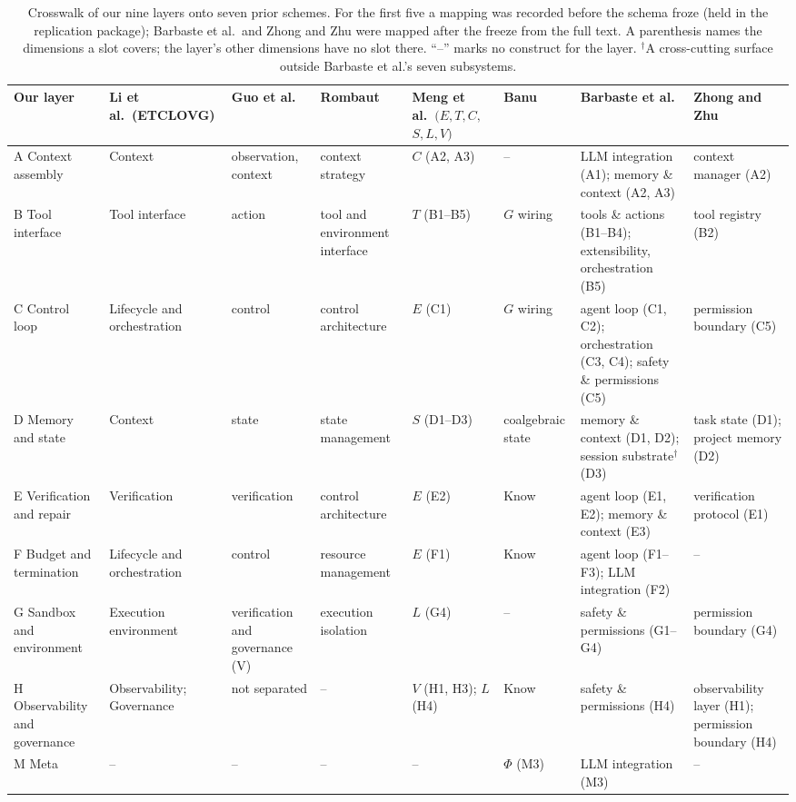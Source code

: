 \begin{table}[t]
\centering
\scriptsize
\setlength{\tabcolsep}{3pt}
\caption{Crosswalk of our nine layers onto seven prior schemes. For the first five a mapping was
recorded before the schema froze (held in the replication package); Barbaste et al.\ and Zhong and
Zhu were mapped after the freeze from the full text. A parenthesis names the dimensions a slot
covers; the layer's other dimensions have no slot there. ``--'' marks no construct for the layer.
$^\dagger$A cross-cutting surface outside Barbaste et al.'s seven subsystems.}
\label{tab:crosswalk}
\begin{tabular}{@{}p{1.7cm}p{1.35cm}p{1.3cm}p{1.5cm}p{1.35cm}p{1.15cm}p{2.0cm}p{1.6cm}@{}}
\toprule
Our layer & Li et al.\ (ETCLOVG) & Guo et al. & Rombaut & Meng et al.\ $(E,T,C,$\allowbreak$S,L,V)$ & Banu &
Barbaste et al. & Zhong and Zhu \\
\midrule
A Context assembly & Context & observation, context & context strategy & $C$ (A2, A3) & -- &
LLM integration (A1); memory \& context (A2, A3) & context manager (A2) \\
B Tool interface & Tool interface & action & tool and environment interface & $T$ (B1--B5) & $G$ wiring &
tools \& actions (B1--B4); extensibility, orchestration (B5) & tool registry (B2) \\
C Control loop & Lifecycle and orchestration & control & control architecture & $E$ (C1) & $G$ wiring &
agent loop (C1, C2); orchestration (C3, C4); safety \& permissions (C5) & permission boundary (C5) \\
D Memory and state & Context & state & state management & $S$ (D1--D3) & coalgebraic state &
memory \& context (D1, D2); session substrate$^\dagger$ (D3) & task state (D1); project memory (D2) \\
E Verification and repair & Verification & verification & control architecture & $E$ (E2) & Know &
agent loop (E1, E2); memory \& context (E3) & verification protocol (E1) \\
F Budget and termination & Lifecycle and orchestration & control & resource management & $E$ (F1) & Know &
agent loop (F1--F3); LLM integration (F2) & -- \\
G Sandbox and environment & Execution environment & verification and governance (V) & execution
isolation & $L$ (G4) & -- & safety \& permissions (G1--G4) & permission boundary (G4) \\
H Observability and governance & Observability; Governance & not separated & -- & $V$ (H1, H3); $L$ (H4) &
Know & safety \& permissions (H4) & observability layer (H1); permission boundary (H4) \\
M Meta & -- & -- & -- & -- & $\Phi$ (M3) & LLM integration (M3) & -- \\
\bottomrule
\end{tabular}
\end{table}

